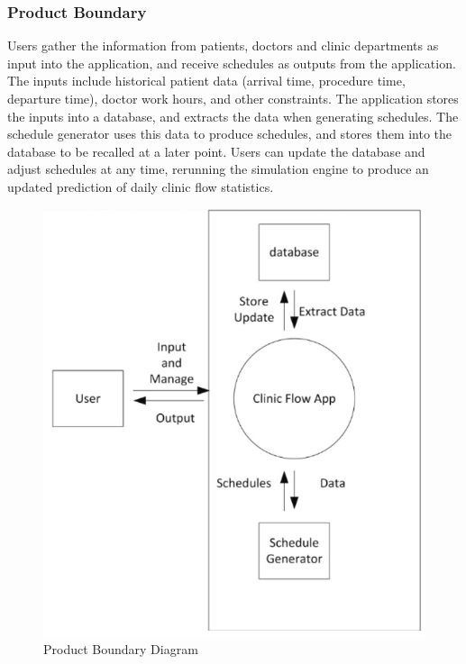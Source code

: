 \documentclass[12pt, titlepage]{article}
\begin{document}
\subsubsection{Product Boundary}
Users gather the information from patients, doctors and clinic departments as input into the application, and receive schedules as outputs from the application. The inputs include historical patient data (arrival time, procedure time, departure time), doctor work hours, and other constraints. The application stores the inputs into a database, and extracts the data when generating schedules. The schedule generator uses this data to produce schedules, and stores them into the database to be recalled at a later point. Users can update the database and adjust schedules at any time, rerunning the simulation engine to produce an updated prediction of daily clinic flow statistics.

\begin{figure}[H]
  \centering
\includegraphics[scale=0.9]{product_boundary.png}
\caption{Product Boundary Diagram}
\end{figure}
\end{document}
